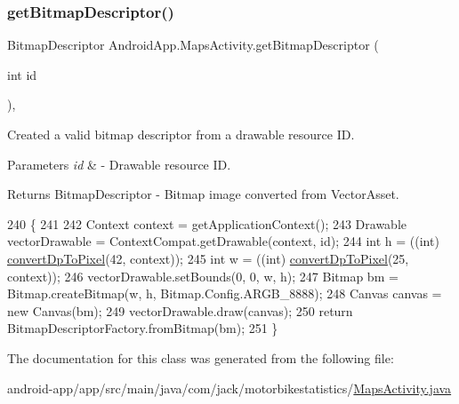 \subsubsection{\texorpdfstring{get\+Bitmap\+Descriptor()}{getBitmapDescriptor()}}
{\footnotesize\ttfamily Bitmap\+Descriptor Android\+App.\+Maps\+Activity.\+get\+Bitmap\+Descriptor (\begin{DoxyParamCaption}\item[{int}]{id }\end{DoxyParamCaption})\hspace{0.3cm}{\ttfamily [inline]}, {\ttfamily [private]}}



Created a valid bitmap descriptor from a drawable resource ID. 


\begin{DoxyParams}{Parameters}
{\em id} & -\/ Drawable resource ID. \\
\hline
\end{DoxyParams}
\begin{DoxyReturn}{Returns}
Bitmap\+Descriptor -\/ Bitmap image converted from Vector\+Asset. 
\end{DoxyReturn}

\begin{DoxyCode}
240                                                          \{
241 
242         Context context = getApplicationContext();
243         Drawable vectorDrawable = ContextCompat.getDrawable(context, \textcolor{keywordtype}{id});
244         \textcolor{keywordtype}{int} h = ((int) \hyperlink{class_android_app_1_1_maps_activity_a2f93b1f03094b96020cee7e06ce5fc85}{convertDpToPixel}(42, context));
245         \textcolor{keywordtype}{int} w = ((int) \hyperlink{class_android_app_1_1_maps_activity_a2f93b1f03094b96020cee7e06ce5fc85}{convertDpToPixel}(25, context));
246         vectorDrawable.setBounds(0, 0, w, h);
247         Bitmap bm = Bitmap.createBitmap(w, h, Bitmap.Config.ARGB\_8888);
248         Canvas canvas = \textcolor{keyword}{new} Canvas(bm);
249         vectorDrawable.draw(canvas);
250         \textcolor{keywordflow}{return} BitmapDescriptorFactory.fromBitmap(bm);
251     \}
\end{DoxyCode}


The documentation for this class was generated from the following file\+:\begin{DoxyCompactItemize}
\item 
android-\/app/app/src/main/java/com/jack/motorbikestatistics/\hyperlink{_maps_activity_8java}{Maps\+Activity.\+java}\end{DoxyCompactItemize}
